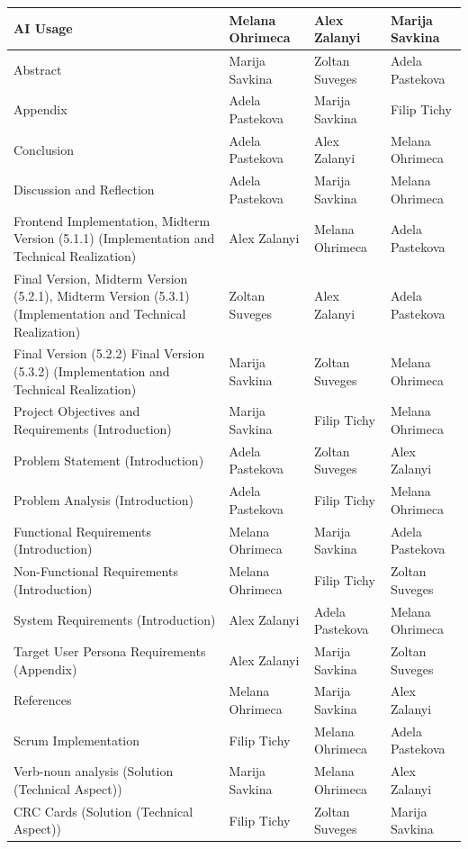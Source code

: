 \begin{longtable}{|p{5.7cm}|p{2.5cm}|p{2.5cm}|p{2.5cm}|}
AI Usage & Melana Ohrimeca & Alex Zalanyi & Marija Savkina \\ \hline
Abstract & Marija Savkina & Zoltan Suveges & Adela Pastekova \\ \hline
Appendix & Adela Pastekova & Marija Savkina & Filip Tichy \\ \hline
Conclusion & Adela Pastekova & Alex Zalanyi & Melana Ohrimeca \\ \hline
Discussion and Reflection & Adela Pastekova & Marija Savkina & Melana Ohrimeca \\ \hline
Frontend Implementation, Midterm Version (5.1.1) (Implementation and Technical Realization) & Alex Zalanyi & Melana Ohrimeca & Adela Pastekova \\ \hline
Final Version, Midterm Version (5.2.1), Midterm Version (5.3.1) (Implementation and Technical Realization) & Zoltan Suveges & Alex Zalanyi & Adela Pastekova \\ \hline
Final Version (5.2.2) Final Version (5.3.2) (Implementation and Technical Realization) & Marija Savkina & Zoltan Suveges & Melana Ohrimeca \\ \hline
Project Objectives and Requirements (Introduction) & Marija Savkina & Filip Tichy & Melana Ohrimeca\\ \hline
Problem Statement (Introduction) & Adela Pastekova & Zoltan Suveges & Alex Zalanyi \\ \hline
Problem Analysis (Introduction) & Adela Pastekova & Filip Tichy & Melana Ohrimeca \\ \hline
Functional Requirements (Introduction) & Melana Ohrimeca & Marija Savkina & Adela Pastekova \\ \hline
Non-Functional Requirements (Introduction) & Melana Ohrimeca & Filip Tichy & Zoltan Suveges \\ \hline
System Requirements (Introduction) & Alex Zalanyi & Adela Pastekova & Melana Ohrimeca \\ \hline
Target User Persona Requirements (Appendix) & Alex Zalanyi & Marija Savkina & Zoltan Suveges \\ \hline
References & Melana Ohrimeca & Marija Savkina & Alex Zalanyi \\ \hline
Scrum Implementation & Filip Tichy & Melana Ohrimeca & Adela Pastekova \\ \hline
Verb-noun analysis (Solution (Technical Aspect)) & Marija Savkina & Melana Ohrimeca & Alex Zalanyi \\ \hline
CRC Cards (Solution (Technical Aspect)) & Filip Tichy & Zoltan Suveges & Marija Savkina \\ \hline

\end{longtable}
